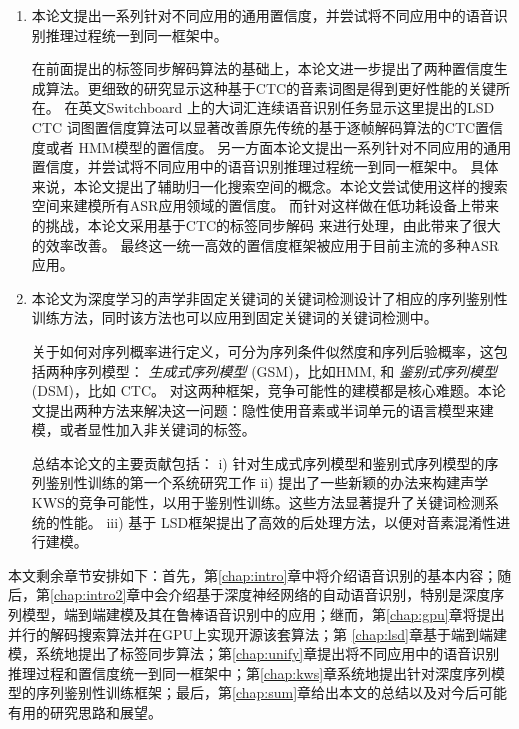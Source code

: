 \begin{enumerate}
\item 本论文提出一系列针对不同应用的通用置信度，并尝试将不同应用中的语音识别推理过程统一到同一框架中。

在前面提出的标签同步解码算法的基础上，本论文进一步提出了两种置信度生成算法。更细致的研究显示这种基于CTC的音素词图是得到更好性能的关键所在。
在英文Switchboard 上的大词汇连续语音识别任务显示这里提出的LSD CTC 词图置信度算法可以显著改善原先传统的基于逐帧解码算法的CTC置信度或者 HMM模型的置信度。
%
另一方面本论文提出一系列针对不同应用的通用置信度，并尝试将不同应用中的语音识别推理过程统一到同一框架中。
%
具体来说，本论文提出了辅助归一化搜索空间的概念。本论文尝试使用这样的搜索空间来建模所有ASR应用领域的置信度。 %
而针对这样做在低功耗设备上带来的挑战，本论文采用基于CTC的标签同步解码\cite{Chen+2016} 来进行处理，由此带来了很大的效率改善。
最终这一统一高效的置信度框架被应用于目前主流的多种ASR应用。

\item 
本论文为深度学习的声学非固定关键词的关键词检测设计了相应的序列鉴别性训练方法，同时该方法也可以应用到固定关键词的关键词检测中。

关于如何对序列概率进行定义，可分为序列条件似然度和序列后验概率，这包括两种序列模型： {\em 生成式序列模型} (GSM)，比如HMM, 和 {\em 鉴别式序列模型} (DSM)，比如 CTC。
对这两种框架，竞争可能性的建模都是核心难题。本论文提出两种方法来解决这一问题：隐性使用音素或半词单元的语言模型来建模，或者显性加入非关键词的标签。

总结本论文的主要贡献包括：
i) 针对生成式序列模型和鉴别式序列模型的序列鉴别性训练的第一个系统研究工作
ii) 提出了一些新颖的办法来构建声学KWS的竞争可能性，以用于鉴别性训练。这些方法显著提升了关键词检测系统的性能。
iii) 基于 LSD框架提出了高效的后处理方法，以便对音素混淆性进行建模。
\end{enumerate}

本文剩余章节安排如下：首先，第\ref{chap:intro}章中将介绍语音识别的基本内容；随后，第\ref{chap:intro2}章中会介绍基于深度神经网络的自动语音识别，特别是深度序列模型，端到端建模及其在鲁棒语音识别中的应用；继而，第\ref{chap:gpu}章将提出并行的解码搜索算法并在GPU上实现开源该套算法；第
\ref{chap:lsd}章基于端到端建模，系统地提出了标签同步算法；第\ref{chap:unify}章提出将不同应用中的语音识别推理过程和置信度统一到同一框架中；第\ref{chap:kws}章系统地提出针对深度序列模型的序列鉴别性训练框架；最后，第\ref{chap:sum}章给出本文的总结以及对今后可能有用的研究思路和展望。
